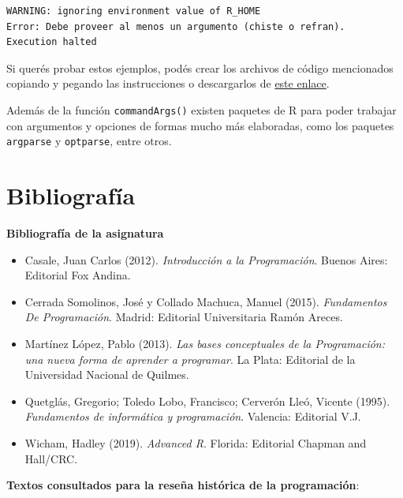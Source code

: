 \documentclass[
]{book}
\providecommand{\tightlist}{%
  \setlength{\itemsep}{0pt}\setlength{\parskip}{0pt}}
\begin{document}
\begin{verbatim}
WARNING: ignoring environment value of R_HOME
Error: Debe proveer al menos un argumento (chiste o refran).
Execution halted
\end{verbatim}

Si querés probar estos ejemplos, podés crear los archivos de código mencionados copiando y pegando las instrucciones o descargarlos de \href{https://github.com/mpru/introprog/tree/master/archivos}{este enlace}.

Además de la función \texttt{commandArgs()} existen paquetes de R para poder trabajar con argumentos y opciones de formas mucho más elaboradas, como los paquetes \texttt{argparse} y \texttt{optparse}, entre otros.

\hypertarget{bibliografuxeda}{%
\chapter*{Bibliografía}\label{bibliografuxeda}}

\textbf{Bibliografía de la asignatura}

\begin{itemize}
\tightlist
\item
  Casale, Juan Carlos (2012). \emph{Introducción a la Programación}. Buenos Aires: Editorial Fox Andina.
\item
  Cerrada Somolinos, José y Collado Machuca, Manuel (2015). \emph{Fundamentos De Programación}. Madrid: Editorial Universitaria Ramón Areces.
\item
  Martínez López, Pablo (2013). \emph{Las bases conceptuales de la Programación: una nueva forma de aprender a programar}. La Plata: Editorial de la Universidad Nacional de Quilmes.
\item
  Quetglás, Gregorio; Toledo Lobo, Francisco; Cerverón Lleó, Vicente (1995). \emph{Fundamentos de informática y programación}. Valencia: Editorial V.J.
\item
  Wicham, Hadley (2019). \emph{Advanced R}. Florida: Editorial Chapman and Hall/CRC.
\end{itemize}

\textbf{Textos consultados para la reseña histórica de la programación}:
\end{document}
